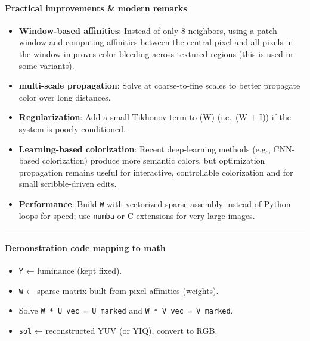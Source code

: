 \documentclass[11pt]{article}
\providecommand{\tightlist}{%
      \setlength{\itemsep}{0pt}\setlength{\parskip}{0pt}}
\begin{document}
\hypertarget{practical-improvements-modern-remarks}{%
\paragraph{\texorpdfstring{\textbf{Practical improvements \& modern
remarks}}{Practical improvements \& modern remarks}}\label{practical-improvements-modern-remarks}}

\begin{itemize}
\tightlist
\item
  \textbf{Window-based affinities}: Instead of only 8 neighbors, using a
  patch window and computing affinities between the central pixel and
  all pixels in the window improves color bleeding across textured
  regions (this is used in some variants).
\item
  \textbf{multi-scale propagation}: Solve at coarse-to-fine scales to
  better propagate color over long distances.
\item
  \textbf{Regularization}: Add a small Tikhonov term to (W) (i.e.~(W +
  \lambda I)) if the system is poorly conditioned.
\item
  \textbf{Learning-based colorization}: Recent deep-learning methods
  (e.g., CNN-based colorization) produce more semantic colors, but
  optimization propagation remains useful for interactive, controllable
  colorization and for small scribble-driven edits.
\item
  \textbf{Performance}: Build \texttt{W} with vectorized sparse assembly
  instead of Python loops for speed; use \texttt{numba} or C extensions
  for very large images.
\end{itemize}

\begin{center}\rule{0.5\linewidth}{0.5pt}\end{center}

\hypertarget{demonstration-code-mapping-to-math}{%
\paragraph{\texorpdfstring{\textbf{Demonstration code mapping to
math}}{Demonstration code mapping to math}}\label{demonstration-code-mapping-to-math}}

\begin{itemize}
\tightlist
\item
  \texttt{Y} ← luminance (kept fixed).
\item
  \texttt{W} ← sparse matrix built from pixel affinities (weights).
\item
  Solve \texttt{W\ *\ U\_vec\ =\ U\_marked} and
  \texttt{W\ *\ V\_vec\ =\ V\_marked}.
\item
  \texttt{sol} ← reconstructed YUV (or YIQ), convert to RGB.
\end{itemize}
\end{document}
